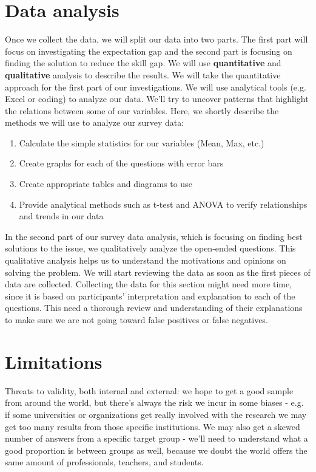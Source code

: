 \documentclass{sigchi}
\begin{document}
 \section{Data analysis}
 Once we collect the data, we will split our data into two parts. The first part will focus on investigating the expectation gap and the second part is focusing on finding the solution to reduce the skill gap. We will use \textbf{quantitative} and \textbf{qualitative} analysis to describe the results. We will take the quantitative approach for the first part of our investigations. We will use analytical tools (e.g. Excel or coding) to analyze our data. We'll try to uncover patterns that highlight the relations between some of our variables. Here, we shortly describe the methods we will use to analyze our survey data:
\begin{enumerate}
	\item Calculate the simple statistics for our variables (Mean, Max, etc.)
	\item Create graphs for each of the questions with error bars
	\item Create appropriate tables and diagrams to use
	\item Provide analytical methods such as t-test and ANOVA to verify relationships and trends in our data
\end{enumerate}
 In the second part of our survey data analysis, which is focusing on finding best solutions to the issue, we qualitatively analyze the open-ended questions. This qualitative analysis helps us to understand the motivations and opinions on solving the problem. We will start reviewing the data as soon as the first pieces of data are collected. Collecting the data for this section might need more time, since it is based on participants' interpretation and explanation to each of the questions. This need a thorough review and understanding of their explanations to make sure we are not going toward false positives or false negatives.

 
 \section{Limitations}
 Threats to validity, both internal and external: we hope to get a good sample from around the world, but there's always the risk we incur in some biases - e.g. if some universities or organizations get really involved with the research we may get too many results from those specific institutions. We may also get a skewed number of answers from a specific target group - we'll need to understand what a good proportion is between groups as well, because we doubt the world offers the same amount of professionals, teachers, and students.
 
\end{document}
